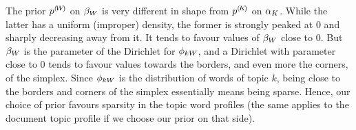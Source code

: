 The prior ${p}^{(\!{W}\!)}$ on $\beta_W$ is very different in shape from ${p}^{(\!{K}\!)}$ on $\alpha_K$. While the latter has a uniform (improper) density, the former is strongly peaked at $0$ and sharply decreasing away from it. It tends to favour values of $\beta_W$ close to $0$. But $\beta_W$ is the parameter of the Dirichlet for $\phi_{kW}$, and a Dirichlet with parameter close to 0 tends to favour values towards the borders, and even more the corners, of the simplex. Since $\phi_{kW}$ is the distribution of words of topic $k$, being close to the borders and corners of the simplex essentially means being sparse. Hence, our choice of prior favours sparsity in the topic word profiles (the same applies to the document topic profile if we choose our prior on that side).
